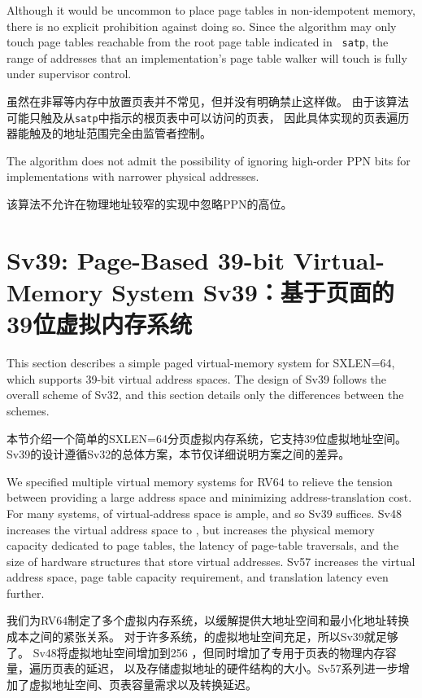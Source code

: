 \begin{commentary}
  Although it would be uncommon to place page tables in non-idempotent memory,
  there is no explicit prohibition against doing so.  Since the algorithm may
  only touch page tables reachable from the root page table indicated in {\tt
  satp}, the range of addresses that an implementation's page table walker will
  touch is fully under supervisor control.

  虽然在非幂等内存中放置页表并不常见，但并没有明确禁止这样做。
  由于该算法可能只触及从{\tt satp}中指示的根页表中可以访问的页表，
  因此具体实现的页表遍历器能触及的地址范围完全由监管者控制。
\end{commentary}

\begin{commentary}
The algorithm does not admit the possibility of ignoring high-order PPN bits
for implementations with narrower physical addresses.

该算法不允许在物理地址较窄的实现中忽略PPN的高位。
\end{commentary}

\section{Sv39: Page-Based 39-bit Virtual-Memory System Sv39：基于页面的39位虚拟内存系统}
\label{sec:sv39}
This section describes a simple paged virtual-memory system
for SXLEN=64, which supports 39-bit virtual address spaces.  The
design of Sv39 follows the overall scheme of Sv32, and this section
details only the differences between the schemes.

本节介绍一个简单的SXLEN=64分页虚拟内存系统，它支持39位虚拟地址空间。
Sv39的设计遵循Sv32的总体方案，本节仅详细说明方案之间的差异。

\begin{commentary}
We specified multiple virtual memory systems for RV64 to relieve the tension
between providing a large address space and minimizing address-translation
cost.  For many systems,  of virtual-address space is ample,
and so Sv39 suffices.  Sv48 increases the virtual address space to
, but increases the physical memory
capacity dedicated to page tables, the latency of page-table traversals, and
the size of hardware structures that store virtual addresses.  Sv57 increases
the virtual address space, page table capacity requirement, and translation
latency even further.

我们为RV64制定了多个虚拟内存系统，以缓解提供大地址空间和最小化地址转换成本之间的紧张关系。
对于许多系统，的虚拟地址空间充足，所以Sv39就足够了。
Sv48将虚拟地址空间增加到256 ，但同时增加了专用于页表的物理内存容量，遍历页表的延迟，
以及存储虚拟地址的硬件结构的大小。Sv57系列进一步增加了虚拟地址空间、页表容量需求以及转换延迟。
\end{commentary}

